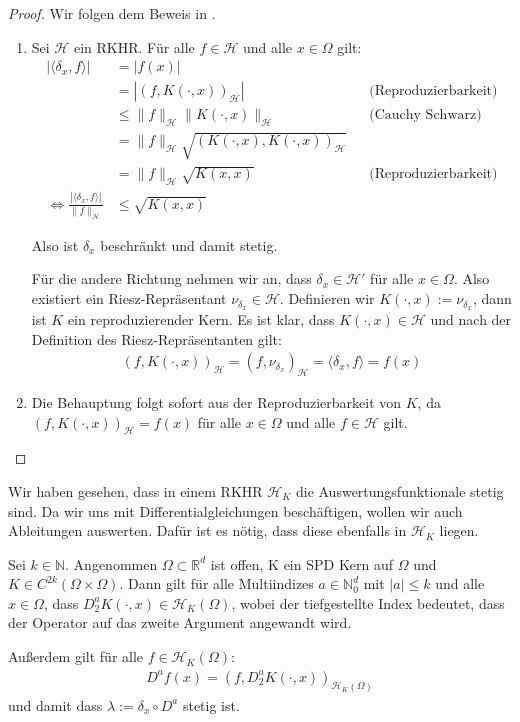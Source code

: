\begin{proof}
Wir folgen dem Beweis in \textcite[Proposition 3.8]{Santin.2017}.
\begin{enumerate}
\item 
Sei $\mathcal{H}$ ein \ac{RKHR}. Für alle $f \in \mathcal{H}$ und alle $x \in \Omega$ gilt:
\begin{align*}
|\langle \delta_x,f \rangle | &= |f(x)|\\ 
&= |(f, K(\cdot,x))_\mathcal{H}| &&\text{(Reproduzierbarkeit)}\\
&\le \|f\|_\mathcal{H}\|K(\cdot,x)\|_\mathcal{H} &&\text{(Cauchy Schwarz)}\\
&= \|f\|_\mathcal{H} \sqrt{(K(\cdot,x),K(\cdot,x))_\mathcal{H}}\\
&= \|f\|_\mathcal{H} \sqrt{K(x,x)} &&\text{(Reproduzierbarkeit)}\\
\Leftrightarrow \frac{|\langle \delta_x,f \rangle|}{\|f\|_\mathcal{H}} &\le \sqrt{K(x,x)}
\end{align*}

Also ist $\delta_x$ beschränkt und damit stetig.

Für die andere Richtung nehmen wir an, dass $\delta_x  \in \mathcal{H}'$ für alle $x \in \Omega$. Also existiert ein Riesz-Repräsentant $\nu_{\delta_x} \in \mathcal{H}$. Definieren wir $K(\cdot,x):= \nu_{\delta_x}$, dann ist $K$ ein reproduzierender Kern. Es ist klar, dass $K(\cdot,x) \in \mathcal{H}$ und nach der Definition des Riesz-Repräsentanten gilt:
\begin{align*}
(f, K(\cdot,x))_\mathcal{H} = (f, \nu_{\delta_x})_\mathcal{H} = \langle \delta_x,f \rangle = f(x)
\end{align*}
\item Die Behauptung folgt sofort aus der Reproduzierbarkeit von $K$, da $(f, K(\cdot,x))_\mathcal{H}= f(x)$ für alle $x \in \Omega$ und alle $f \in \mathcal{H}$ gilt.
\end{enumerate}
\end{proof}

Wir haben gesehen, dass in einem \ac{RKHR} $\mathcal{H}_K$ die Auswertungsfunktionale stetig sind. Da wir uns mit Differentialgleichungen beschäftigen, wollen wir auch Ableitungen auswerten. Dafür ist es nötig, dass diese ebenfalls in $\mathcal{H}_K$ liegen.

\begin{theorem}
Sei $k \in \mathbb{N}$. Angenommen $\Omega \subset \mathbb{R}^d$ ist offen, K ein \ac{SPD} Kern auf $\Omega$ und $K \in C^{2k}(\Omega \times \Omega)$. Dann gilt für alle Multiindizes $a \in \mathbb{N}_0^d$ mit $|a| \le k$ und alle $x \in \Omega$, dass $D_2^a K(\cdot , x) \in \mathcal{H}_K(\Omega)$, wobei der tiefgestellte Index bedeutet, dass der Operator auf das zweite Argument angewandt wird.

Außerdem gilt für alle $f \in \mathcal{H}_K(\Omega)$:
\begin{align*}
D^a f(x) = \left(f,D_2^a K(\cdot,x)\right)_{\mathcal{H}_K(\Omega)}
\end{align*}
und damit dass $\lambda := \delta_x \circ D^a$ stetig ist.
\end{theorem}

